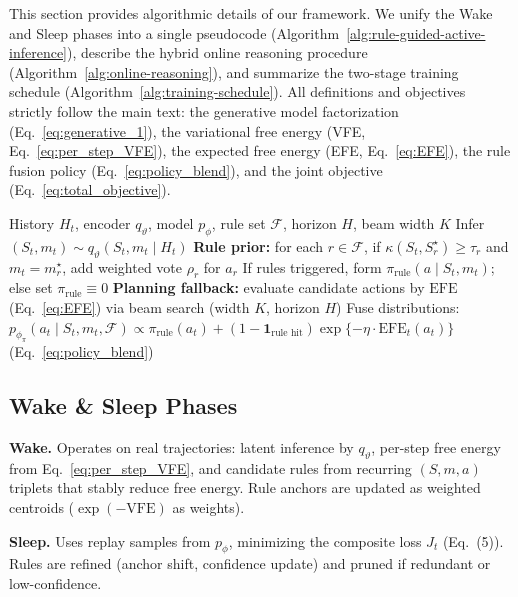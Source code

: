 \documentclass{article} %
\begin{document}
This section provides algorithmic details of our framework. We unify the Wake and Sleep phases into a single pseudocode (Algorithm~\ref{alg:rule-guided-active-inference}), describe the hybrid online reasoning procedure (Algorithm~\ref{alg:online-reasoning}), and summarize the two-stage training schedule (Algorithm~\ref{alg:training-schedule}). All definitions and objectives strictly follow the main text: the generative model factorization (Eq.~\ref{eq:generative_1}), the variational free energy (VFE, Eq.~\ref{eq:per_step_VFE}), the expected free energy (EFE, Eq.~\ref{eq:EFE}), the rule fusion policy (Eq.~\ref{eq:policy_blend}), and the joint objective (Eq.~\ref{eq:total_objective}).

\begin{algorithm}[ht]
\caption{Online Reasoning with Rule Fusion and Planning}
\label{alg:online-reasoning}
\begin{algorithmic}[1]
\Require History $H_t$, encoder $q_{\vartheta}$, model $p_{\phi}$, rule set $\mathcal F$, horizon $H$, beam width $K$
\State Infer $(S_t,m_t)\!\sim\!q_{\vartheta}(S_t,m_t\mid H_t)$
\State \textbf{Rule prior:} for each $r\in\mathcal F$, if $\kappa(S_t,S_r^\star)\!\ge\!\tau_r$ and $m_t=m_r^\star$, add weighted vote $\rho_r$ for $a_r$
\State If rules triggered, form $\pi_{\text{rule}}(a\mid S_t,m_t)$; else set $\pi_{\text{rule}}\equiv 0$
\State \textbf{Planning fallback:} evaluate candidate actions by $\mathrm{EFE}$ (Eq.~\ref{eq:EFE}) via beam search (width $K$, horizon $H$)
\State Fuse distributions: $p_{\phi_\pi}(a_t\mid S_t,m_t,\mathcal F) \propto \pi_{\text{rule}}(a_t) + (1-\mathbf{1}_{\text{rule hit}})\exp\{-\eta\cdot\mathrm{EFE}_t(a_t)\}$ \hfill (Eq.~\ref{eq:policy_blend})
\end{algorithmic}
\end{algorithm}

\subsection{Wake \& Sleep Phases}
\textbf{Wake.} Operates on real trajectories: latent inference by $q_{\vartheta}$, per-step free energy from Eq.~\ref{eq:per_step_VFE}, and candidate rules from recurring $(S,m,a)$ triplets that stably reduce free energy. Rule anchors are updated as weighted centroids ($\exp(-\mathrm{VFE})$ as weights).  

\textbf{Sleep.} Uses replay samples from $p_{\phi}$, minimizing the composite loss $J_t$ (Eq.~(5)). Rules are refined (anchor shift, confidence update) and pruned if redundant or low-confidence.  
\end{document}
